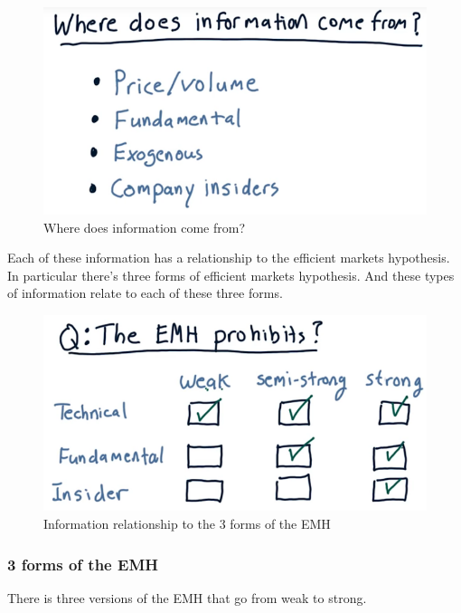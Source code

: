 \documentclass[12pt]{article}
\begin{document}
\begin{figure}[!ht]
\centering
\includegraphics[scale=0.4]{fig/fig56}
\caption{Where does information come from?}
\end{figure}

Each of these information has a relationship to the efficient markets hypothesis. In particular there's three forms of efficient markets hypothesis. And these types of information relate to each of these three forms. 

\begin{figure}[!ht]
\centering
\includegraphics[scale=0.4]{fig/fig57}
\caption{Information relationship to the 3 forms of the EMH}
\end{figure}

\subsubsection{3 forms of the EMH}

There is three versions of the EMH that go from weak to strong. 
\end{document}

